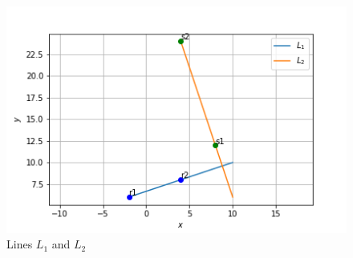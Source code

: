 \documentclass[journal,12pt,twocolumn]{IEEEtran}
\begin{document}
\begin{figure}[!ht]
    \includegraphics[width= \columnwidth]{assignment8.png}
    \caption{Lines $L_1$ and $L_2$}
    \label{fig:1}
\end{figure}
\end{document}
